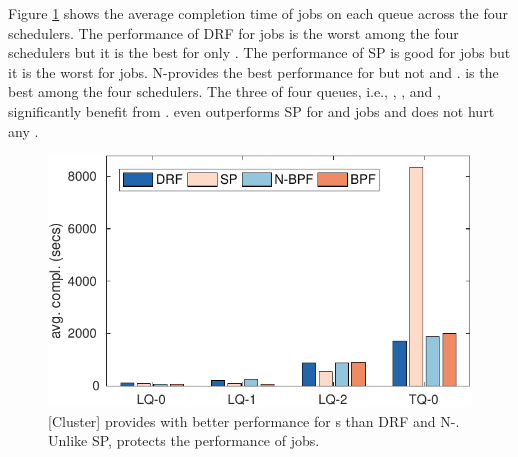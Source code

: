 Figure \ref{fig:avg_multi_queue_cluster} shows the average completion time of jobs on each queue across the four schedulers.
The performance of DRF for \burstq jobs is the worst among the four schedulers but it is the best for only .
The performance of SP is good for \burstq jobs but it is the worst for \batchq jobs.
N-\name provides the best performance for  but not  and .
\name is the best among the four schedulers.
The three of four queues, i.e., , , and , significantly benefit from \name.
\name even outperforms SP for  and  jobs and does not hurt any {\batchq}.

\begin{figure}[!h]
	\centering
	\includegraphics[width=0.8\linewidth]{fig/avg_multi_queues_impl}
	\caption{[Cluster] \name provides with better performance for {\burstq}s than DRF and N-\name. Unlike SP, \name protects the performance of \batchq jobs.}
	\label{fig:avg_multi_queue_cluster}
\end{figure}
